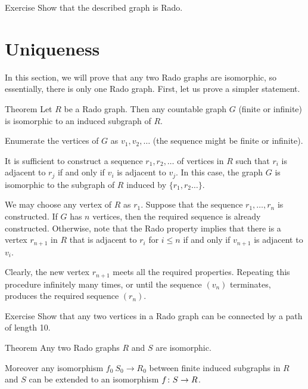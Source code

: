 \begin{thm}{Exercise}\label{ex:rado-costructive}
Show that the described graph is Rado.
\end{thm}


\section{Uniqueness}

In this section, we will prove that any two Rado graphs are isomorphic, so essentially, there is only one Rado graph.
First, let us prove a simpler statement.

\begin{thm}{Theorem}\label{thm:rado-subgraph}
Let $R$ be a Rado graph.
Then any countable graph $G$ (finite or infinite) is isomorphic to an induced subgraph of $R$. 
\end{thm}

Enumerate the vertices of $G$ as $v_1 , v_2 , \dots$ (the sequence might be finite or infinite).

It is sufficient to construct a sequence $r_1,r_2,\dots$ of vertices in $R$ such that $r_i$ is adjacent to $r_j$ if and only if $v_i$ is adjacent to $v_j$.
In this case, the graph $G$ is isomorphic to the subgraph of $R$ induced by $\{r_1,r_2\dots\}$.

We may choose any vertex of $R$ as $r_1$.
Suppose that the sequence $r_1,\dots,r_n$ is constructed.
If $G$ has $n$ vertices, then the required sequence is already constructed.
Otherwise, note that the Rado property implies that there is a vertex $r_{n+1}$ in $R$ that is adjacent to $r_i$ for $i\le n$ if and only if $v_{n+1}$ is adjacent to $v_i$.

Clearly, the new vertex $r_{n+1}$ meets all the required properties.
Repeating this procedure infinitely many times, or until the sequence $(v_n)$ terminates, produces the required sequence $(r_n)$.
\qeds


\begin{thm}{Exercise}\label{ex:rado-path10}
Show that any two vertices in a Rado graph can be connected by a path of length 10.
\end{thm}


\begin{thm}{Theorem}\label{thm:rado-isom}
Any two Rado graphs $R$ and $S$ are isomorphic.

Moreover any isomorphism $f_0\:S_0\to R_0$ between finite induced subgraphs in $R$ and $S$ can be extended to an isomorphism $f\colon S\to R$.
\end{thm}

